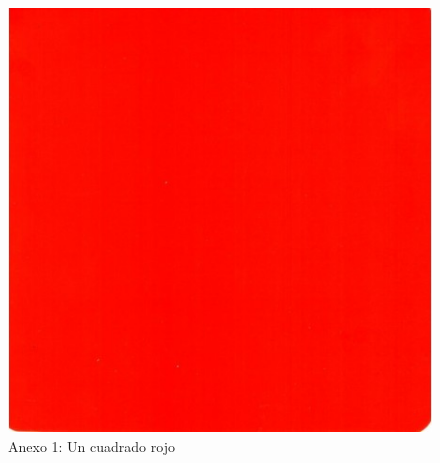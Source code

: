 \addappheadtotoc              %
\begin{appendix}
  \appendixpage
  \begin{figure}
    \centering
    \includegraphics[scale=0.5]{cuadrado-rojo}\\
    Anexo 1: Un cuadrado rojo %
  \end{figure}
\end{appendix}